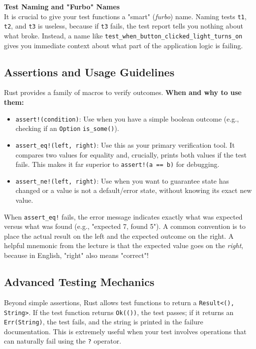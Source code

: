 \begin{insightbox}
\textbf{Test Naming and "Furbo" Names}\\
It is crucial to give your test functions a "smart" (\textit{furbo}) name. Naming tests \texttt{t1}, \texttt{t2}, and \texttt{t3} is useless, because if \texttt{t3} fails, the test report tells you nothing about what broke. Instead, a name like \texttt{test\_when\_button\_clicked\_light\_turns\_on} gives you immediate context about what part of the application logic is failing.
\end{insightbox}

\subsection{Assertions and Usage Guidelines}
Rust provides a family of macros to verify outcomes. \textbf{When and why to use them:}
\begin{itemize}
    \item \texttt{assert!(condition)}: Use when you have a simple boolean outcome (e.g., checking if an \texttt{Option} \texttt{is\_some()}).
    \item \texttt{assert\_eq!(left, right)}: Use this as your primary verification tool. It compares two values for equality and, crucially, prints both values if the test fails. This makes it far superior to \texttt{assert!(a == b)} for debugging. 
    \item \texttt{assert\_ne!(left, right)}: Use when you want to guarantee state has changed or a value is not a default/error state, without knowing its exact new value.
\end{itemize}

When \texttt{assert\_eq!} fails, the error message indicates exactly what was expected versus what was found (e.g., "expected 7, found 5"). A common convention is to place the actual result on the left and the expected outcome on the right. A helpful mnemonic from the lecture is that the expected value goes on the \textit{right}, because in English, "right" also means "correct"!

\subsection{Advanced Testing Mechanics}
Beyond simple assertions, Rust allows test functions to return a \texttt{Result<(), String>}. If the test function returns \texttt{Ok(())}, the test passes; if it returns an \texttt{Err(String)}, the test fails, and the string is printed in the failure documentation. This is extremely useful when your test involves operations that can naturally fail using the \texttt{?} operator.

